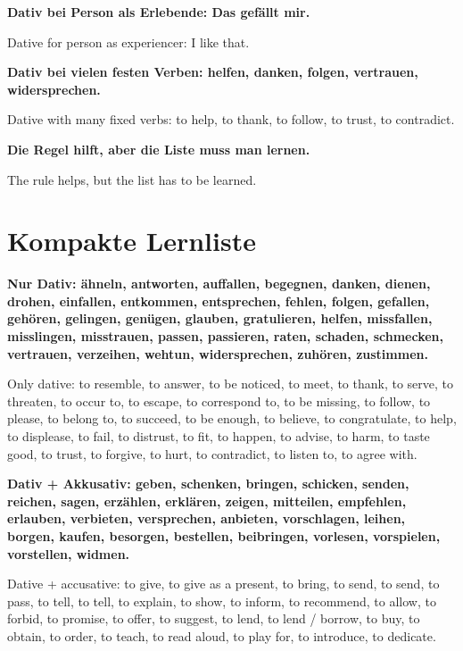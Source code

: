\documentclass[a4paper]{article}
\newcommand{\EN}[1]{\par{\small\textcolor{TranslationGray}{#1}}\vspace{0.4em}}
\begin{document}
        \textbf{Dativ bei Person als Erlebende: Das gefällt mir.}
        \EN{Dative for person as experiencer: I like that.}
        
        \textbf{Dativ bei vielen festen Verben: helfen, danken, folgen, vertrauen, widersprechen.}
        \EN{Dative with many fixed verbs: to help, to thank, to follow, to trust, to contradict.}
        
        \textbf{Die Regel hilft, aber die Liste muss man lernen.}
        \EN{The rule helps, but the list has to be learned.}
    
    
    \section{Kompakte Lernliste}
        
        \textbf{Nur Dativ: ähneln, antworten, auffallen, begegnen, danken, dienen, drohen, einfallen, entkommen, entsprechen, fehlen, folgen, gefallen, gehören, gelingen, genügen, glauben, gratulieren, helfen, missfallen, misslingen, misstrauen, passen, passieren, raten, schaden, schmecken, vertrauen, verzeihen, wehtun, widersprechen, zuhören, zustimmen.}
        \EN{Only dative: to resemble, to answer, to be noticed, to meet, to thank, to serve, to threaten, to occur to, to escape, to correspond to, to be missing, to follow, to please, to belong to, to succeed, to be enough, to believe, to congratulate, to help, to displease, to fail, to distrust, to fit, to happen, to advise, to harm, to taste good, to trust, to forgive, to hurt, to contradict, to listen to, to agree with.}
        
        \textbf{Dativ + Akkusativ: geben, schenken, bringen, schicken, senden, reichen, sagen, erzählen, erklären, zeigen, mitteilen, empfehlen, erlauben, verbieten, versprechen, anbieten, vorschlagen, leihen, borgen, kaufen, besorgen, bestellen, beibringen, vorlesen, vorspielen, vorstellen, widmen.}
        \EN{Dative + accusative: to give, to give as a present, to bring, to send, to send, to pass, to tell, to tell, to explain, to show, to inform, to recommend, to allow, to forbid, to promise, to offer, to suggest, to lend, to lend / borrow, to buy, to obtain, to order, to teach, to read aloud, to play for, to introduce, to dedicate.}
        
        \nocite{*}
        
        
\end{document}
